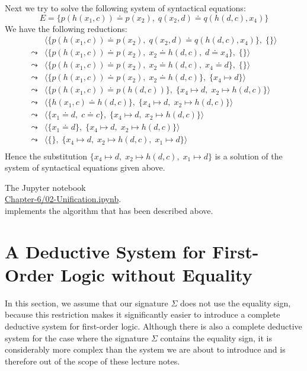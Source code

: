 \exampleEng
Next we try to solve the following system of syntactical equations: 
\[ E = \big\{ p(h(x_1,c)) \doteq p(x_2),\; q(x_2, d) \doteq q(h(d,c),x_4) \big\} \]
We have the following reductions:
$$
\begin{array}{ll}
          & \big\langle \big\{ p(h(x_1,c)) \doteq p(x_2),\; q(x_2, d) \doteq q(h(d,c),x_4) \big\},\; \{ \} \big\rangle \\[0.2cm]
 \leadsto & \big\langle \big\{ p(h(x_1,c)) \doteq p(x_2),\; x_2 \doteq h(d,c), \; d \doteq x_4 \big\},\; \{ \} \big\rangle \\[0.2cm]
 \leadsto & \big\langle \big\{ p(h(x_1,c)) \doteq p(x_2),\; x_2 \doteq h(d,c), \; x_4 \doteq d \big\},\; \{ \} \big\rangle \\[0.2cm]
 \leadsto & \big\langle \big\{ p(h(x_1,c)) \doteq p(x_2),\; x_2 \doteq h(d,c) \big\},\; \{ x_4 \mapsto d \} \big\rangle \\[0.2cm]
 \leadsto & \big\langle \big\{ p(h(x_1,c)) \doteq p(h(d,c)) \big\},\; \{ x_4 \mapsto d,\; x_2 \mapsto h(d,c) \} \big\rangle \\[0.2cm]
 \leadsto & \big\langle \big\{ h(x_1,c) \doteq h(d,c) \big\},\; \{ x_4 \mapsto d,\; x_2 \mapsto h(d,c) \} \big\rangle \\[0.2cm]
 \leadsto & \big\langle \big\{ x_1 \doteq d,\; c \doteq c \big\},\; \{ x_4 \mapsto d,\; x_2 \mapsto h(d,c) \} \big\rangle \\[0.2cm]
 \leadsto & \big\langle \big\{ x_1 \doteq d\big\},\; \{ x_4 \mapsto d,\; x_2 \mapsto h(d,c) \} \big\rangle \\[0.2cm]
 \leadsto & \big\langle \big\{\big\},\; \{ x_4 \mapsto d,\; x_2 \mapsto h(d,c),\; x_1 \mapsto d \} \big\rangle \\[0.2cm]
\end{array}
$$
Hence the  substitution  $\{ x_4 \mapsto d,\; x_2 \mapsto h(d,c),\; x_1 \mapsto d \}$ is a solution
of the system of syntactical equations given above.
\eox

The Jupyter notebook
\\[0.2cm]
\hspace*{1.3cm}
\href{https://github.com/karlstroetmann/Logic/blob/master/TypeScript/Chapter-6/02-Unification.ipynb}{Chapter-6/02-Unification.ipynb}.
\\[0.2cm]
implements the algorithm that has been described above.

\section{A Deductive System for First-Order Logic without Equality \label{sec:fol-calculus}}
In this section, we assume that our signature $\Sigma$ does not use the equality sign, because this restriction
makes it significantly easier to introduce a complete deductive system for first-order logic. Although there is
also a complete deductive system for the case where the signature $\Sigma$ contains the equality sign, it is
considerably more complex than the system we are about to introduce and is therefore out of the scope of these
lecture notes. 

